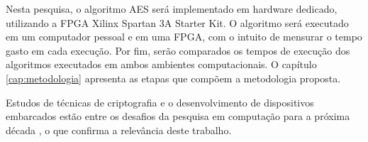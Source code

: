 \documentclass{tcc}
\begin{document}
Nesta pesquisa, o algoritmo AES será implementado em hardware dedicado, utilizando a FPGA Xilinx Spartan 3A Starter Kit. O algoritmo será executado em um computador pessoal e em uma FPGA, com o intuito de mensurar o tempo gasto em cada execução. Por fim, serão comparados os tempos de execução dos algoritmos executados em ambos ambientes computacionais. O capítulo \ref{cap:metodologia} apresenta as etapas que compõem a metodologia proposta.


Estudos de técnicas de criptografia e o desenvolvimento de dispositivos embarcados estão entre os desafios da pesquisa em computação para a próxima década \cite{grandesDesafios2013}, o que confirma a relevância deste trabalho.






\end{document}

